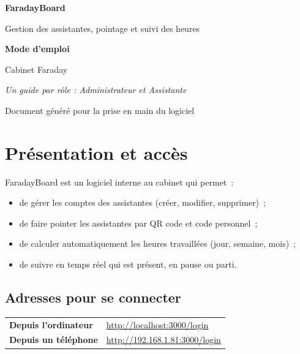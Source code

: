 \documentclass[11pt,a4paper]{article}
\begin{document}
\begin{titlepage}
\centering
\vspace*{3cm}
{\Huge\bfseries\color{faraday} FaradayBoard\par}
\vspace{0.5cm}
{\Large Gestion des assistantes, pointage et suivi des heures\par}
\vspace{1.5cm}
{\Large\bfseries Mode d'emploi\par}
\vspace{0.4cm}
{\large Cabinet Faraday\par}
\vfill
{\large\itshape Un guide par rôle : Administrateur et Assistante\par}
\vspace{1cm}
{\color{ardoise} Document généré pour la prise en main du logiciel}
\vspace*{2cm}
\end{titlepage}

\tableofcontents
\newpage

\section{Présentation et accès}

FaradayBoard est un logiciel interne au cabinet qui permet~:
\begin{itemize}[leftmargin=1.4em]
  \item de gérer les comptes des assistantes (créer, modifier, supprimer)~;
  \item de faire pointer les assistantes par QR code et code personnel~;
  \item de calculer automatiquement les heures travaillées (jour, semaine, mois)~;
  \item de suivre en temps réel qui est présent, en pause ou parti.
\end{itemize}

\subsection{Adresses pour se connecter}

\begin{tabular}{>{\bfseries}p{4.5cm} p{9.5cm}}
\toprule
Depuis l'ordinateur & \url{http://localhost:3000/login} \\
Depuis un téléphone & \url{http://192.168.1.81:3000/login} \\
\bottomrule
\end{tabular}
\end{document}
